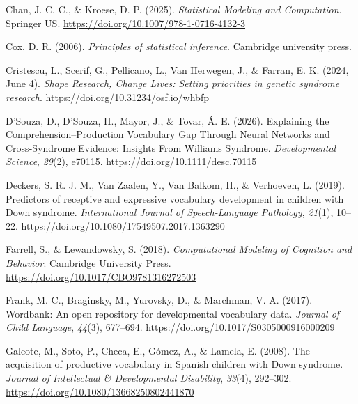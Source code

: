 \documentclass[
  11pt,
  a4paper,
]{report}
\newlength{\cslhangindent}
\newenvironment{CSLReferences}[2] %
 {\begin{list}{}{%
  \setlength{\itemindent}{0pt}
  \setlength{\leftmargin}{0pt}
  \setlength{\parsep}{0pt}
  \ifodd #1
   \setlength{\leftmargin}{\cslhangindent}
   \setlength{\itemindent}{-1\cslhangindent}
  \fi
  \setlength{\itemsep}{#2\baselineskip}}}
 {\end{list}}
\begin{document}
\begin{CSLReferences}{1}{0}
Chan, J. C. C., \& Kroese, D. P. (2025). \emph{Statistical {Modeling}
and {Computation}}. Springer US.
\url{https://doi.org/10.1007/978-1-0716-4132-3}

Cox, D. R. (2006). \emph{Principles of statistical inference}. Cambridge
university press.

Cristescu, L., Scerif, G., Pellicano, L., Van Herwegen, J., \& Farran,
E. K. (2024, June 4). \emph{Shape {Research}, {Change Lives}: {Setting}
priorities in genetic syndrome research}.
\url{https://doi.org/10.31234/osf.io/whbfp}

D'Souza, D., D'Souza, H., Mayor, J., \& Tovar, Á. E. (2026). Explaining
the {Comprehension}--{Production Vocabulary Gap Through Neural Networks}
and {Cross-Syndrome Evidence}: {Insights From Williams Syndrome}.
\emph{Developmental Science}, \emph{29}(2), e70115.
\url{https://doi.org/10.1111/desc.70115}

Deckers, S. R. J. M., Van Zaalen, Y., Van Balkom, H., \& Verhoeven, L.
(2019). Predictors of receptive and expressive vocabulary development in
children with {Down} syndrome. \emph{International Journal of
Speech-Language Pathology}, \emph{21}(1), 10--22.
\url{https://doi.org/10.1080/17549507.2017.1363290}

Farrell, S., \& Lewandowsky, S. (2018). \emph{Computational {Modeling}
of {Cognition} and {Behavior}}. Cambridge University Press.
\url{https://doi.org/10.1017/CBO9781316272503}

Frank, M. C., Braginsky, M., Yurovsky, D., \& Marchman, V. A. (2017).
Wordbank: An open repository for developmental vocabulary data.
\emph{Journal of Child Language}, \emph{44}(3), 677--694.
\url{https://doi.org/10.1017/S0305000916000209}

Galeote, M., Soto, P., Checa, E., Gómez, A., \& Lamela, E. (2008). The
acquisition of productive vocabulary in {Spanish} children with {Down}
syndrome. \emph{Journal of Intellectual \& Developmental Disability},
\emph{33}(4), 292--302. \url{https://doi.org/10.1080/13668250802441870}


\end{CSLReferences}
\end{document}

